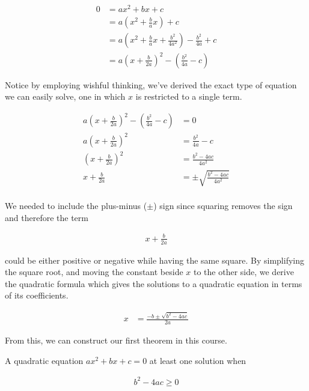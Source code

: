 \documentclass{report}
\begin{document}
\begin{align*}
	0 &= ax^2 + bx + c \\
	&= a \left( x^2 + \frac{b}{a}x \right) + c \\
	&= a \left( x^2 + \frac{b}{a}x + \frac{b^2}{4a^2} \right) - \frac{b^2}{4a} + c \\
	&= a \left( x + \frac{b}{2a} \right)^2 - \left(\frac{b^2}{4a} - c \right)
\end{align*}

Notice by employing wishful thinking, we've derived the exact type of equation we can easily solve, one in which $x$ is restricted to a single term.

\begin{align*}
	a \left( x + \frac{b}{2a} \right)^2 - \left( \frac{b^2}{4a} -c \right) &= 0 \\
	a \left( x + \frac{b}{2a} \right)^2 &= \frac{b^2}{4a} - c \\
	\left( x + \frac{b}{2a} \right)^2 &= \frac{b^2 - 4ac}{4a^2} \\
	x + \frac{b}{2a} &= \pm \sqrt{\frac{b^2 - 4ac}{4a^2}} \\
\end{align*}

We needed to include the plus-minus ($\pm$) sign since squaring removes the sign and therefore the term

\begin{align*}
	x + \frac{b}{2a}
\end{align*}

could be either positive or negative while having the same square. By simplifying the square root, and moving the constant beside $x$ to the other side, we derive the quadratic formula which gives the solutions to a quadratic equation in terms of its coefficients.

\begin{align}
	x &= \frac{-b \pm \sqrt{b^2 - 4ac}}{2a}
\end{align}

From this, we can construct our first theorem in this course.

\vspace{\baselineskip}
\begin{theorem}
	A quadratic equation $ax^2 + bx + c = 0$ at least one solution when
	
	\begin{align}
		b^2 - 4ac \ge 0
	\end{align}
\end{theorem}
\end{document}
